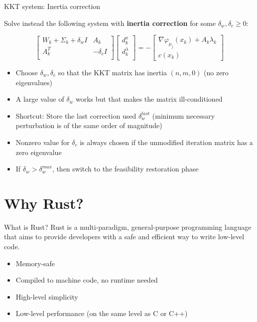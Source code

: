 \documentclass{beamer}
\begin{document}
\begin{frame}{KKT system: Inertia correction}

  Solve instead the following system with \textbf{inertia correction} for some $\delta_w, \delta_c \ge 0$:

  \begin{equation*}
    \begin{bmatrix}
      W_k + \Sigma_k + \delta_w I & A_k          \\
      A_k^T                       & - \delta_c I \\
    \end{bmatrix}
    \begin{bmatrix}
      d_k^x       \\
      d_k^\lambda \\
    \end{bmatrix}
    =
    -
    \begin{bmatrix}
      \nabla \varphi_{\mu_j}(x_k) + A_k \lambda_k \\
      c(x_k)
    \end{bmatrix}
  \end{equation*}

  \vfill
  \pause

  \begin{itemize}
    \item Choose $\delta_w, \delta_c$ so that the KKT matrix has inertia $(n, m, 0)$ (no zero eigenvalues)
    \item A large value of $\delta_w$ works but that makes the matrix ill-conditioned
    \item Shortcut: Store the last correction used $\delta_w^{last}$ (minimum necessary perturbation is of the same order of magnitude)
    \item Nonzero value for $\delta_c$ is always chosen if the unmodified iteration matrix has a zero eigenvalue
    \item If $\delta_w > \delta_w^{max}$, then switch to the feasibility restoration phase
  \end{itemize}

\end{frame}

\section{Why Rust?}

\begin{frame}{What is Rust?}
  Rust is a multi-paradigm, general-purpose programming language that
  aims to provide developers with a safe and efficient way to write low-level code.

  \vfill
  \pause

  \begin{itemize}
    \item Memory-safe
    \item Compiled to machine code, no runtime needed
    \item High-level simplicity
    \item Low-level performance (on the same level as C or C++)
  \end{itemize}
\end{frame}
\end{document}
